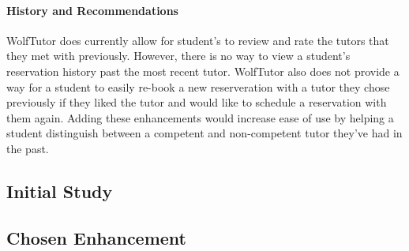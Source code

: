 \paragraph{History and Recommendations}
WolfTutor does currently allow for student's to review and rate the tutors that they met with previously. However, there is no way to view a student's reservation history past the most recent tutor. WolfTutor also does not provide a way for a student to easily re-book a new reserveration with a tutor they chose previously if they liked the tutor and would like to schedule a reservation with them again. Adding these enhancements would increase ease of use by helping a student distinguish between a competent and non-competent tutor they've had in the past. 

\subsection{Initial Study}
\label{sec:initial-study}

\subsection{Chosen Enhancement}
\label{sec:chosen-enhancement}

